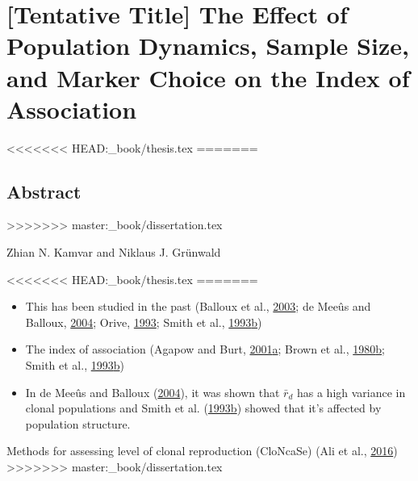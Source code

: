 \documentclass[double,12pt]{beavtex}
\providecommand{\tightlist}{%
  \setlength{\itemsep}{0pt}\setlength{\parskip}{0pt}}
\begin{document}
  \chapter{{[}Tentative Title{]} The Effect of Population Dynamics, Sample
  Size, and Marker Choice on the Index of
  Association}\label{tentative-title-the-effect-of-population-dynamics-sample-size-and-marker-choice-on-the-index-of-association}
  
<<<<<<< HEAD:_book/thesis.tex
  \singlespacing
=======
  \section{Abstract}\label{abstract-3}
>>>>>>> master:_book/dissertation.tex
  
  \begin{center}
  
  
  Zhian N. Kamvar and Niklaus J. Grünwald
  
<<<<<<< HEAD:_book/thesis.tex
=======
    \begin{itemize}
    \tightlist
    \item
      This has been studied in the past (Balloux et al.,
      \protect\hyperlink{ref-balloux2003population}{2003}; de Meeûs and
      Balloux, \protect\hyperlink{ref-de2004clonal}{2004}; Orive,
      \protect\hyperlink{ref-orive1993effective}{1993}; Smith et al.,
      \protect\hyperlink{ref-smith1993how}{1993}\protect\hyperlink{ref-smith1993how}{b})
    \item
      The index of association (Agapow and Burt,
      \protect\hyperlink{ref-Agapow_2001}{2001}\protect\hyperlink{ref-Agapow_2001}{a};
      Brown et al.,
      \protect\hyperlink{ref-brown1980multilocus}{1980}\protect\hyperlink{ref-brown1980multilocus}{b};
      Smith et al.,
      \protect\hyperlink{ref-smith1993how}{1993}\protect\hyperlink{ref-smith1993how}{b})
    \item
      In de Meeûs and Balloux
      (\protect\hyperlink{ref-de2004clonal}{2004}), it was shown that
      \(\bar{r}_d\) has a high variance in clonal populations and Smith et
      al.
      (\protect\hyperlink{ref-smith1993how}{1993}\protect\hyperlink{ref-smith1993how}{b})
      showed that it's affected by population structure.
    \end{itemize}
  \item
    Methods for assessing level of clonal reproduction (CloNcaSe) (Ali et
    al., \protect\hyperlink{ref-ali2016cloncase}{2016})
>>>>>>> master:_book/dissertation.tex
  
  
  \end{center}\vspace*{\fill}
  
\end{document}
